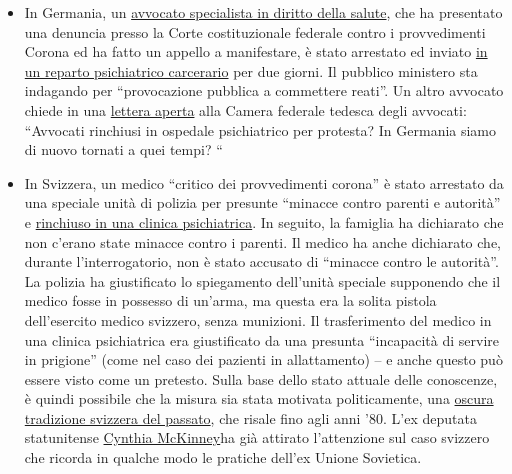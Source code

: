 \begin{itemize}
\tightlist
\item
  In Germania, un \href{http://beatebahner.de/}{avvocato specialista in
  diritto della salute}, che ha presentato una denuncia presso la Corte
  costituzionale federale contro i provvedimenti Corona ed ha fatto un
  appello a manifestare, è stato arrestato ed inviato
  \href{https://www.rnz.de/nachrichten/heidelberg_artikel,-nach-aufruf-zu-corona-demo-heidelberger-anwaeltin-in-psychiatrischer-einrichtung-update-_arid,508747.html}{in
  un reparto psichiatrico carcerario} per due giorni. Il pubblico
  ministero sta indagando per ``provocazione pubblica a commettere
  reati''. Un altro avvocato chiede in una
  \href{https://www.nachrichtenspiegel.de/2020/04/14/brief-an-die-bundesrechtsanwaltskammer-in-causa-bahmer/}{lettera
  aperta} alla Camera federale tedesca degli avvocati: ``Avvocati
  rinchiusi in ospedale psichiatrico per protesta? In Germania siamo di
  nuovo tornati a quei tempi? ``
\item
  In Svizzera, un medico ``critico dei provvedimenti corona'' è stato
  arrestato da una speciale unità di polizia per presunte ``minacce
  contro parenti e autorità'' e
  \href{https://www.srf.ch/news/regional/aargau-solothurn/festnahme-von-corona-kritiker-verschwoerung-oder-normale-intervention-der-aargauer-behoerden}{rinchiuso
  in una clinica psichiatrica}. In seguito, la famiglia ha dichiarato
  che non c'erano state minacce contro i parenti. Il medico ha anche
  dichiarato che, durante l'interrogatorio, non è stato accusato di
  ``minacce contro le autorità''. La polizia ha giustificato lo
  spiegamento dell'unità speciale supponendo che il medico fosse in
  possesso di un'arma, ma questa era la solita pistola dell'esercito
  medico svizzero, senza munizioni. Il trasferimento del medico in una
  clinica psichiatrica era giustificato da una presunta ``incapacità di
  servire in prigione'' (come nel caso dei pazienti in allattamento) --
  e anche questo può essere visto come un pretesto. Sulla base dello
  stato attuale delle conoscenze, è quindi possibile che la misura sia
  stata motivata politicamente, una
  \href{https://www.revue.ch/ausgaben/2019/06/detail/news/detail/News/als-die-schweiz-arme-und-unangepasste-wegsperrte-1/}{oscura
  tradizione svizzera del passato}, che risale fino agli anni '80. L'ex
  deputata statunitense
  \href{https://twitter.com/cynthiamckinney/status/1250075810838581248}{Cynthia
  McKinney}ha già attirato l'attenzione sul caso svizzero che ricorda in
  qualche modo le pratiche dell'ex Unione Sovietica.

\end{itemize}
